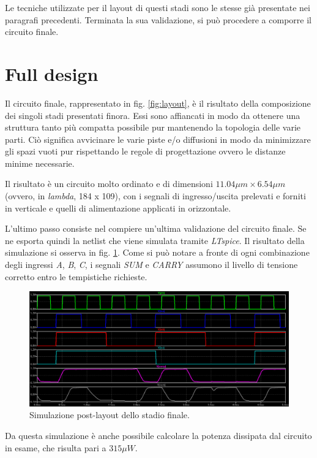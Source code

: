 Le tecniche utilizzate per il layout di questi stadi sono le stesse già presentate nei paragrafi precedenti. Terminata la sua validazione, si può procedere a comporre il circuito finale.

\section{Full design}
\label{sec:sec_fullDesign}

Il circuito finale, rappresentato in fig. \ref{fig:layout}, è il risultato della composizione dei singoli stadi presentati finora. Essi sono affiancati in modo da ottenere una struttura tanto più compatta possibile pur mantenendo la topologia delle varie parti. Ciò significa avvicinare le varie piste e/o diffusioni in modo da minimizzare gli spazi vuoti pur rispettando le regole di progettazione ovvero le distanze minime necessarie. 

Il risultato è un circuito molto ordinato e di dimensioni $11.04 \mu m \times 6.54 \mu m$ (ovvero, in \textit{lambda}, 184 x 109), con i segnali di ingresso/uscita prelevati e forniti in verticale e quelli di alimentazione applicati in orizzontale.

L'ultimo passo consiste nel compiere un'ultima validazione del circuito finale. Se ne esporta quindi la netlist che viene simulata tramite \textit{LTspice}. Il risultato della simulazione si osserva in fig. \ref{fig:simulazioneFinale}. Come si può notare a fronte di ogni combinazione degli ingressi \textit{A}, \textit{B}, \textit{C}, i segnali \textit{SUM} e \textit{CARRY} assumono il livello di tensione corretto entro le tempistiche richieste.  

\begin{figure}[hbt!]
	\centering
	\includegraphics[width=1.5\textwidth, angle=90]{figure/Sim_FullDesign_PostLayout.PNG}
	\caption{Simulazione post-layout dello stadio finale.}
	\label{fig:simulazioneFinale}
\end{figure}

Da questa simulazione è anche possibile calcolare la potenza dissipata dal circuito in esame, che risulta pari a $315\mu W$.






